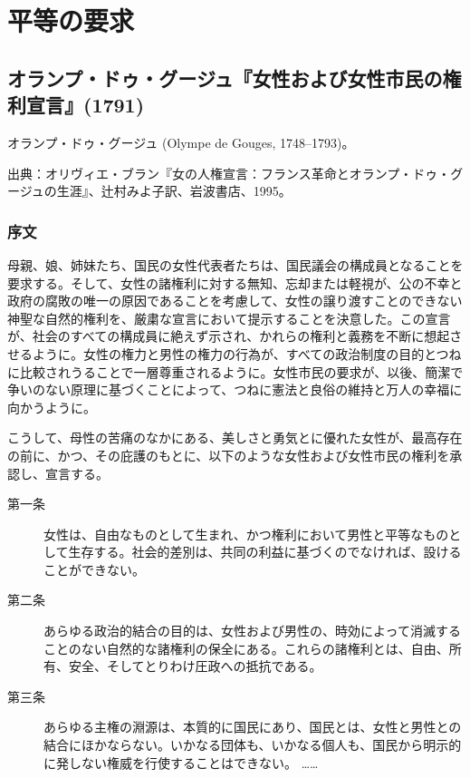 



\chapter{平等の要求}




\section{オランプ・ドゥ・グージュ『女性および女性市民の権利宣言』(1791)}

オランプ・ドゥ・グージュ (Olympe de Gouges, 1748--1793)。


出典：オリヴィエ・ブラン『女の人権宣言：フランス革命とオランプ・ドゥ・グージュの生涯』、辻村みよ子訳、岩波書店、1995。

\subsection*{序文}

母親、娘、姉妹たち、国民の女性代表者たちは、国民議会の構成員となることを要求する。そして、女性の諸権利に対する無知、忘却または軽視が、公の不幸と政府の腐敗の唯一の原因であることを考慮して、女性の譲り渡すことのできない神聖な自然的権利を、厳粛な宣言において提示することを決意した。この宣言が、社会のすべての構成員に絶えず示され、かれらの権利と義務を不断に想起させるように。女性の権力と男性の権力の行為が、すべての政治制度の目的とつねに比較されうることで一層尊重されるように。女性市民の要求が、以後、簡潔で争いのない原理に基づくことによって、つねに憲法と良俗の維持と万人の幸福に向かうように。

こうして、母性の苦痛のなかにある、美しさと勇気とに優れた女性が、最高存在の前に、かつ、その庇護のもとに、以下のような女性および女性市民の権利を承認し、宣言する。

\begin{description}

 \item[第一条] 女性は、自由なものとして生まれ、かつ権利において男性と平等なものとして生存する。社会的差別は、共同の利益に基づくのでなければ、設けることができない。

 \item[第二条] あらゆる政治的結合の目的は、女性および男性の、時効によって消滅することのない自然的な諸権利の保全にある。これらの諸権利とは、自由、所有、安全、そしてとりわけ圧政への抵抗である。

 \item[第三条] あらゆる主権の淵源は、本質的に国民にあり、国民とは、女性と男性との結合にほかならない。いかなる団体も、いかなる個人も、国民から明示的に発しない権威を行使することはできない。
……

 \end{description}



